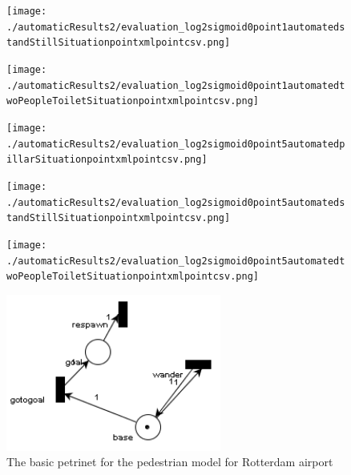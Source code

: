 \documentclass[11pt]{book}
\begin{document}
\begin{figure}
\centering
\texttt{[image: ./automaticResults2/evaluation\_log2sigmoid0point1automatedstandStillSituationpointxmlpointcsv.png]}
\label{evaluation_log2sigmoid0point1automatedstandStillSituationpointxmlpointcsv}
\end{figure}
\clearpage

\begin{figure}
\centering
\texttt{[image: ./automaticResults2/evaluation\_log2sigmoid0point1automatedtwoPeopleToiletSituationpointxmlpointcsv.png]}
\label{evaluation_log2sigmoid0point1automatedtwoPeopleToiletSituationpointxmlpointcsv}
\end{figure}

\begin{figure}
\centering
\texttt{[image: ./automaticResults2/evaluation\_log2sigmoid0point5automatedpillarSituationpointxmlpointcsv.png]}
\label{evaluation_log2sigmoid0point5automatedpillarSituationpointxmlpointcsv}
\end{figure}

\begin{figure}
\centering
\texttt{[image: ./automaticResults2/evaluation\_log2sigmoid0point5automatedstandStillSituationpointxmlpointcsv.png]}
\label{evaluation_log2sigmoid0point5automatedstandStillSituationpointxmlpointcsv}
\end{figure}
\clearpage

\begin{figure}
\centering
\texttt{[image: ./automaticResults2/evaluation\_log2sigmoid0point5automatedtwoPeopleToiletSituationpointxmlpointcsv.png]}
\label{evaluation_log2sigmoid0point5automatedtwoPeopleToiletSituationpointxmlpointcsv}
\end{figure}

\begin{figure}
\centering
\includegraphics[width=200pt]{rotterdamPedestrianNet}
\caption{The basic petrinet for the pedestrian model for Rotterdam airport}
\label{basicnet}
\end{figure}
\end{document}

